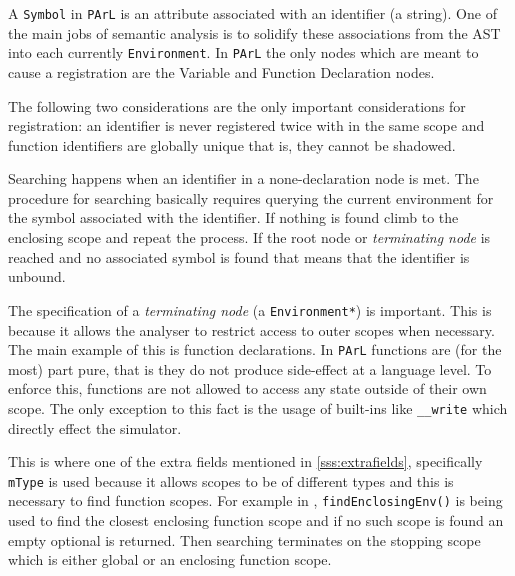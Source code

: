 A \texttt{Symbol} in \texttt{PArL} is an attribute associated
with an identifier (a string). One of the main jobs of semantic
analysis is to solidify these associations from the AST into
each currently \texttt{Environment}. In \texttt{PArL} the only
nodes which are meant to cause a registration are the Variable
and Function Declaration nodes.

The following two considerations are the only important
considerations for registration: an identifier is never
registered twice with in the same scope and function identifiers
are globally unique that is, they cannot be shadowed.



Searching happens when an identifier in a none-declaration node
is met. The procedure for searching basically requires querying
the current environment for the symbol associated with the
identifier. If nothing is found climb to the enclosing scope and
repeat the process. If the root node or \emph{terminating node}
is reached and no associated symbol is found that means that the
identifier is unbound.

\begin{note}
The specification of a \emph{terminating node} (a
\texttt{Environment*}) is important. This is because it allows
the analyser to restrict access to outer scopes when necessary.
The main example of this is function declarations. In
\texttt{PArL} functions are (for the most) part pure, that is
they do not produce side-effect at a language level. To enforce
this, functions are not allowed to access any state outside of
their own scope. The only exception to this fact is the usage of
built-ins like \texttt{__write} which directly effect the
simulator.
\end{note}

This is where one of the extra fields mentioned in
\ref{sss:extrafields}, specifically \texttt{mType} is used
because it allows scopes to be of different types and this is
necessary to find function scopes. For example in
, \texttt{findEnclosingEnv()} is being
used to find the closest enclosing function scope and if no such
scope is found an empty optional is returned. Then searching
terminates on the stopping scope which is either global or an
enclosing function scope.

